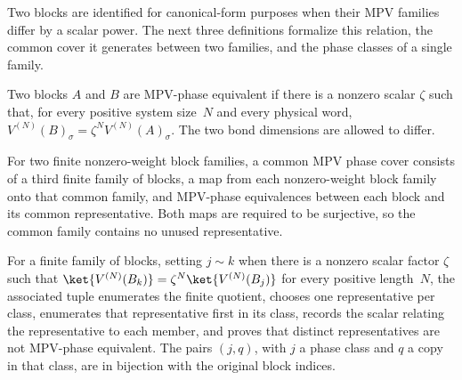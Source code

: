 Two blocks are identified for canonical-form purposes when their MPV families
differ by a scalar power. The next three definitions formalize this relation,
the common cover it generates between two families, and the phase classes of a
single family.

\begin{definition}
    \label{def:mpv_block_phase_equiv}
    \leanok
    Two blocks $A$ and $B$ are MPV-phase equivalent if there is a nonzero
    scalar $\zeta$ such that, for every positive system size~$N$ and every
    physical word, $V^{(N)}(B)_\sigma=\zeta^N V^{(N)}(A)_\sigma$.
    The two bond dimensions are allowed to differ.
\end{definition}

\begin{definition}
    \label{def:mpv_common_phase_cover}
    \leanok
    For two finite nonzero-weight block families, a common MPV phase cover consists of a third
    finite family of blocks, a map from each nonzero-weight block family onto that common
    family, and MPV-phase equivalences between each block and its common
    representative. Both maps are required to be surjective, so the common family
    contains no unused representative.
\end{definition}

\begin{definition}%
    \label{def:mpv_phase_class_data}
    \leanok
    For a finite family of blocks, setting $j \sim k$ when there is a nonzero
    scalar factor $\zeta$ such that
    $\ket{V^{(N)}(B_k)}=\zeta^N\ket{V^{(N)}(B_j)}$ for every positive
    length~$N$, the associated tuple enumerates the finite quotient,
    chooses one representative per class, enumerates that representative first
    in its class, records the scalar relating the representative to each member,
    and proves that distinct representatives are not MPV-phase equivalent. The
    pairs $(j,q)$, with $j$ a phase class and $q$ a copy in that class, are in
    bijection with the original block indices.
\end{definition}

